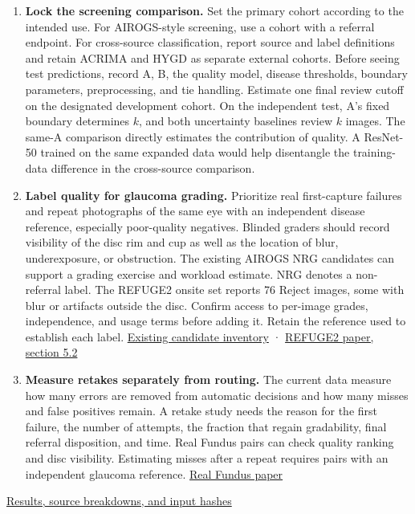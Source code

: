 \documentclass[
  10pt,
  letterpaper,
]{article}
\providecommand{\tightlist}{%
  \setlength{\itemsep}{0pt}\setlength{\parskip}{0pt}}
\begin{document}
\begin{enumerate}
\def\labelenumi{\arabic{enumi}.}
\tightlist
\item
  \textbf{Lock the screening comparison.} Set the primary cohort
  according to the intended use. For AIROGS-style screening, use a
  cohort with a referral endpoint. For cross-source classification,
  report source and label definitions and retain ACRIMA and HYGD as
  separate external cohorts. Before seeing test predictions, record A,
  B, the quality model, disease thresholds, boundary parameters,
  preprocessing, and tie handling. Estimate one final review cutoff on
  the designated development cohort. On the independent test, A's fixed
  boundary determines \(k\), and both uncertainty baselines review \(k\)
  images. The same-A comparison directly estimates the contribution of
  quality. A ResNet-50 trained on the same expanded data would help
  disentangle the training-data difference in the cross-source
  comparison.
\item
  \textbf{Label quality for glaucoma grading.} Prioritize real
  first-capture failures and repeat photographs of the same eye with an
  independent disease reference, especially poor-quality negatives.
  Blinded graders should record visibility of the disc rim and cup as
  well as the location of blur, underexposure, or obstruction. The
  existing AIROGS NRG candidates can support a grading exercise and
  workload estimate. NRG denotes a non-referral label. The REFUGE2
  onsite set reports 76 Reject images, some with blur or artifacts
  outside the disc. Confirm access to per-image grades, independence,
  and usage terms before adding it. Retain the reference used to
  establish each label.
  \href{quality-alignment.en.md\#implications-for-the-next-experiments}{Existing
  candidate inventory} ·
  \href{https://arxiv.org/html/2202.08994\#S5.SS2}{REFUGE2 paper,
  section 5.2}
\item
  \textbf{Measure retakes separately from routing.} The current data
  measure how many errors are removed from automatic decisions and how
  many misses and false positives remain. A retake study needs the
  reason for the first failure, the number of attempts, the fraction
  that regain gradability, final referral disposition, and time. Real
  Fundus pairs can check quality ranking and disc visibility. Estimating
  misses after a repeat requires pairs with an independent glaucoma
  reference. \href{https://arxiv.org/abs/2201.00466}{Real Fundus paper}
\end{enumerate}

\href{proposal-review-results.json}{Results, source breakdowns, and
input hashes}
\end{document}
